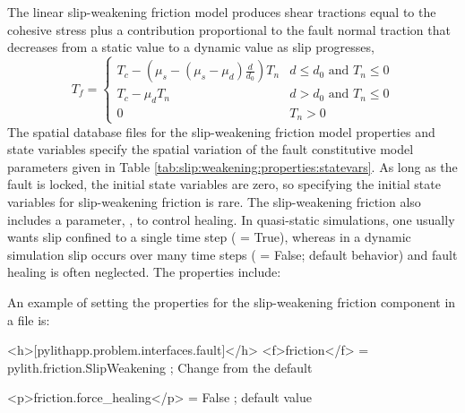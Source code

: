 The linear slip-weakening friction model produces shear tractions
equal to the cohesive stress plus a contribution proportional to the
fault normal traction that decreases from a static value to a dynamic
value as slip progresses,
\begin{equation}
T_{f}=\begin{cases}
T_{c}-(\mu_{s}-(\mu_{s}-\mu_{d})\frac{d}{d_{0}})T_{n} & d\leq d_{0}\text{ and }T_{n}\leq0\\
T_{c}-\mu_{d}T_{n} & d>d_{0}\text{ and }T_{n}\leq0\\
0 & T_{n}>0
\end{cases}
\end{equation}
The spatial database files for the slip-weakening friction model properties
and state variables specify the spatial variation of the fault constitutive
model parameters given in Table \vref{tab:slip:weakening:properties:statevars}.
As long as the fault is locked, the initial state variables are zero,
so specifying the initial state variables for slip-weakening friction
is rare. The slip-weakening friction also includes a parameter, ,
to control healing. In quasi-static simulations, one usually wants
slip confined to a single time step ( = True),
whereas in a dynamic simulation slip occurs over many time steps (
= False; default behavior) and fault healing is often neglected. The
properties include:
\begin{inventory}
\end{inventory}
An example of setting the properties for the slip-weakening friction
component in a  file is:
\begin{cfg}
<h>[pylithapp.problem.interfaces.fault]</h>
<f>friction</f> = pylith.friction.SlipWeakening ; Change from the default

<p>friction.force_healing</p> = False ; default value
\end{cfg}

